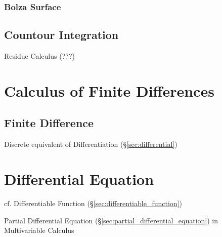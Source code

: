 \subsubsection{Bolza Surface}\label{sec:bolza_surface}



\subsection{Countour Integration}\label{sec:contour_integration}

Residue Calculus (???) %



\section{Calculus of Finite Differences}\label{sec:finite_differences_calculus}


\subsection{Finite Difference}\label{sec:finite_difference}

Discrete equivalent of Differentiation (\S\ref{sec:differential})



\section{Differential Equation}\label{sec:differential_equation}

cf. Differentiable Function (\S\ref{sec:differentiable_function})

\fist Partial Differential Equation (\S\ref{sec:partial_differential_equation})
in Multivariable Calculus



